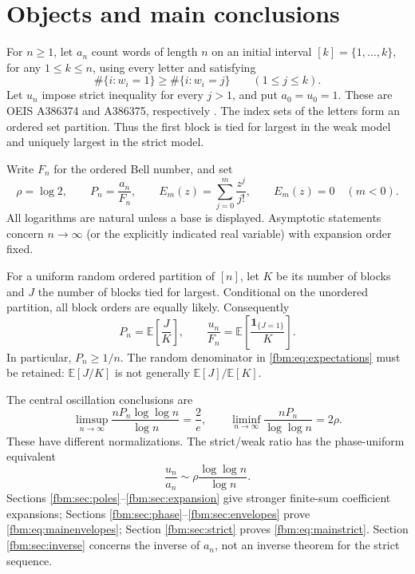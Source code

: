\documentclass[11pt]{article}
\theoremstyle{remark}\newtheorem{remark}[theorem]{Remark}
\newcommand{\E}{\mathbb E}
\begin{document}
\section{Objects and main conclusions}
For $n\geq1$, let $a_n$ count words of length $n$ on an initial interval $[k]=\{1,\ldots,k\}$, for any $1\leq k\leq n$, using every letter and satisfying
\[
 \#\{i:w_i=1\}\geq \#\{i:w_i=j\}\qquad(1\leq j\leq k).
\]
Let $u_n$ impose strict inequality for every $j>1$, and put $a_0=u_0=1$. These are OEIS A386374 and A386375, respectively \cite{weak,strict}. The index sets of the letters form an ordered set partition. Thus the first block is tied for largest in the weak model and uniquely largest in the strict model.

Write $F_n$ for the ordered Bell number, and set
\[
 \rho=\log 2,\qquad P_n=\frac{a_n}{F_n},\qquad E_m(z)=\sum_{j=0}^m\frac{z^j}{j!},
 \qquad E_m(z)=0\quad(m<0).
\]
All logarithms are natural unless a base is displayed. Asymptotic statements concern $n\to\infty$ (or the explicitly indicated real variable) with expansion order fixed.

For a uniform random ordered partition of $[n]$, let $K$ be its number of blocks and $J$ the number of blocks tied for largest. Conditional on the unordered partition, all block orders are equally likely. Consequently
\begin{equation}\label{fbm:eq:expectations}
 P_n=\E\!\left[\frac{J}{K}\right],\qquad
 \frac{u_n}{F_n}=\E\!\left[\frac{\boldsymbol 1_{\{J=1\}}}{K}\right].
\end{equation}
In particular, $P_n\geq1/n$. The random denominator in \eqref{fbm:eq:expectations} must be retained: $\E[J/K]$ is not generally $\E[J]/\E[K]$.

The central oscillation conclusions are
\begin{equation}\label{fbm:eq:mainenvelopes}
 \limsup_{n\to\infty}\frac{nP_n\log\log n}{\log n}=\frac2e,
 \qquad
 \liminf_{n\to\infty}\frac{nP_n}{\log\log n}=2\rho.
\end{equation}
These have different normalizations. The strict/weak ratio has the phase-uniform equivalent
\begin{equation}\label{fbm:eq:mainstrict}
 \frac{u_n}{a_n}\sim\rho\frac{\log\log n}{\log n}.
\end{equation}
Sections \ref{fbm:sec:poles}--\ref{fbm:sec:expansion} give stronger finite-sum coefficient expansions; Sections \ref{fbm:sec:phase}--\ref{fbm:sec:envelopes} prove \eqref{fbm:eq:mainenvelopes}; Section \ref{fbm:sec:strict} proves \eqref{fbm:eq:mainstrict}. Section \ref{fbm:sec:inverse} concerns the inverse of $a_n$, not an inverse theorem for the strict sequence.
\end{document}
